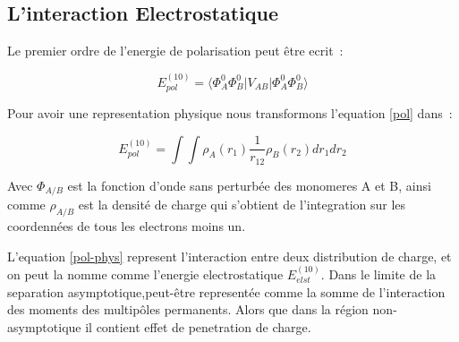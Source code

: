 \subsection{L'interaction Electrostatique}


Le premier ordre de l'energie de polarisation peut être ecrit :

\begin{equation}
E_{pol}^{(10)} = \langle \Phi_{A}^{0} \Phi_{B}^{0} |V_{AB}| \Phi_{A}^{0} \Phi_{B}^{0} \rangle  \label{pol}
\end{equation}

Pour avoir une representation physique nous transformons l'equation \ref{pol} dans :

\begin{equation}
E_{pol}^{(10)} = \int \int \rho_{A} (r_{1}) \frac{1}{r_{12}} \rho_{B} (r_{2}) dr_{1} dr_{2} \label{pol-phys}
\end{equation}

Avec $\Phi_{A/B}$ est la fonction d'onde sans perturbée des monomeres A et B, ainsi comme $\rho_{A/B}$ est la densité de charge qui s'obtient de l'integration sur les coordennées de tous les electrons moins un. 

L'equation \ref{pol-phys} represent l'interaction entre deux distribution de charge, et on peut la nomme comme l'energie electrostatique $E_{elst}^{(10)}$. Dans le limite de la separation asymptotique,peut-être representée comme la somme de l'interaction des moments des multipôles permanents. Alors que dans la région non-asymptotique il contient effet de penetration de charge.


		